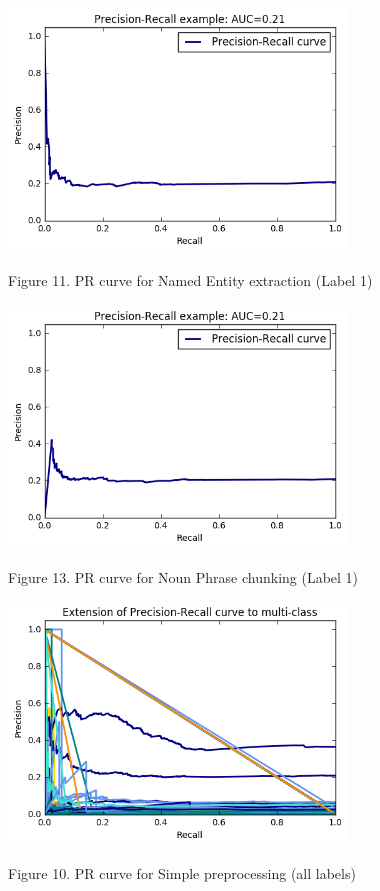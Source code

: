 \documentclass[fleqn,10pt]{SelfArx} %
\begin{document}
\begin{enumerate}
\begin{figure}
\begin{minipage}[b]{1.0\linewidth}
  \centering
  \centerline{\includegraphics[width=9cm]{SampleGraphLabel2}}
  \centerline{Figure 11. PR curve for Named Entity extraction (Label 1)}\medskip
\end{minipage}

\begin{minipage}[b]{1.0\linewidth}
  \centering
  \centerline{\includegraphics[width=9cm]{SampleGraphLabel3}}
  \centerline{Figure 13. PR curve for Noun Phrase chunking (Label 1)}\medskip
\end{minipage}

\end{figure}


\begin{figure}

\begin{minipage}[b]{1.0\linewidth}
  \centering
  \centerline{\includegraphics[width=9cm]{MulticlassPvsR1}}
  \centerline{Figure 10. PR curve for Simple preprocessing (all labels)}\medskip
\end{minipage}


\end{figure}
\end{enumerate}
\end{document}
